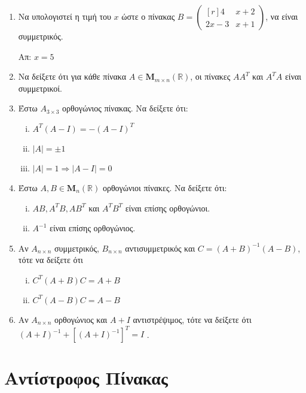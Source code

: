 \documentclass[a4paper,table]{report}
\begin{document}
\begin{enumerate}
  \item Να υπολογιστεί η τιμή του $x$ ώστε ο πίνακας $ B = 
    \begin{pmatrix*}[r]
      4 & x+2 \\
      2x-3 & x+1 
    \end{pmatrix*} $, να είναι συμμετρικός. 

    \hfill Απ: $x=5$  
  \item Να δείξετε ότι για κάθε πίνακα $ A \in \textbf{M}_{m \times n}(\mathbb{R}) $, 
    οι πίνακες $ AA^{T} $ και $ A^{T}A $ είναι συμμετρικοί.

  \item Έστω $ A_{3\times 3} $ ορθογώνιος πίνακας. Να δείξετε ότι:
    \begin{enumerate}[i)]
      \item $ A^{T}(A-I) = -(A-I)^{T} $
      \item $ |A|=\pm 1 $
      \item $ |A|=1 \Rightarrow |A-I|=0 $
    \end{enumerate}

  \item Έστω $ A,B \in \textbf{M}_{n}(\mathbb{R}) $ ορθογώνιοι πίνακες. Να δείξετε ότι: 
    \begin{enumerate}[i)]
      \item $ AB, A^{T}B, AB^{T} $ και $ A^{T}B^{T} $ είναι επίσης ορθογώνιοι.
      \item $ A^{-1} $ είναι επίσης ορθογώνιος.
    \end{enumerate}

  \item Αν $A_{n\times n}$ συμμετρικός, $B_{n\times n}$ αντισυμμετρικός και 
    $C =(A+B)^{-1}(A-B) $, τότε να δείξετε ότι 
    \begin{enumerate}[i)]
      \item $C^{T}(A+B)C=A+B $
      \item $ C^{T}(A-B)C=A-B $
    \end{enumerate}

  \item Αν $A_{n\times n}$ ορθογώνιος και $ A+I $ αντιστρέψιμος, τότε να δείξετε ότι 
    $ (A+I)^{-1} + [(A+I)^{-1}]^{T} = I $ .
\end{enumerate}


\section*{Αντίστροφος Πίνακας}
\end{document}
